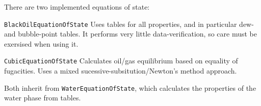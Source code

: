 There are two implemented equations of state:
\begin{list}{}{}
\item[\texttt{BlackOilEquationOfState}] Uses tables for all
  properties, and in particular dew- and bubble-point tables. It
  performs very little data-verification, so care must be exersised
  when using it.
\item[\texttt{CubicEquationOfState}] Calculates oil/gas equilibrium
  based on equality of fugacities. Uses a mixed
  sucessive-subsitution/Newton's method approach.
\end{list}
Both inherit from \texttt{WaterEquationOfState}, which calculates the
properties of the water phase from tables.

